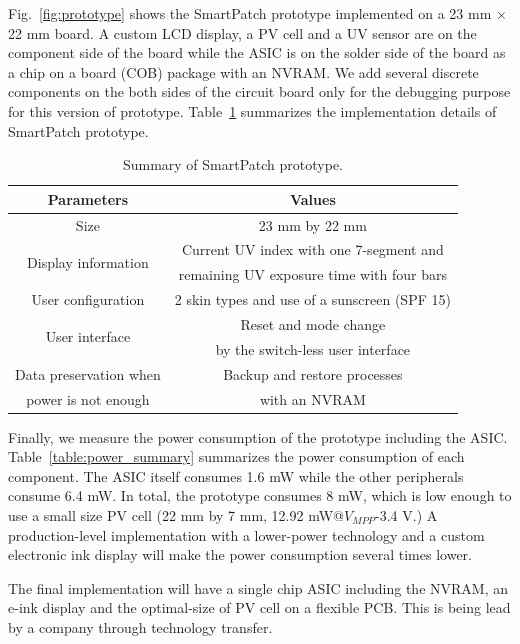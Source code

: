 \documentclass[journal]{IEEEtran}
\begin{document}
Fig.~\ref{fig:prototype} shows the SmartPatch prototype implemented on a 23 mm $\times$ 22 mm board. 
A custom LCD display, a PV cell and a UV sensor are on the component side of the board while the ASIC is on the solder side of the board as a chip on a board (COB) package with an NVRAM.  
We add several discrete components on the both sides of the circuit board only for the debugging purpose for this version of prototype. 
Table~\ref{table:prototype_summary} summarizes the implementation details of SmartPatch prototype.  

\begin{table}
\centering
\caption{Summary of SmartPatch prototype.}
\label{table:prototype_summary}
\begin{tabular}{|c|c|}  \hline
Parameters			&Values	\\ \hline \hline
Size					&23 mm by 22 mm  \\ \hline
\multirow{2}{*}{Display information}	&Current UV index with one 7-segment and\\
					&remaining UV exposure time with four bars \\ \hline
User configuration		&2 skin types and use of a sunscreen (SPF 15) \\ \hline
\multirow{2}{*}{User interface}	&Reset and mode change  \\
					&by the switch-less user interface \\ \hline
Data preservation when 	&Backup and restore processes  \\
power is not enough	&with an NVRAM \\ \hline
\end{tabular}
\end{table}

Finally, we measure the power consumption of the prototype including the ASIC. 
Table~\ref{table:power_summary} summarizes the power consumption of each component. 
The ASIC itself consumes 1.6 mW while the other peripherals consume 6.4 mW. 
In total, the prototype consumes 8 mW, which is low enough to use a small size PV cell (22 mm by 7 mm, 12.92 mW@$V_{MPP}$-3.4 V.) 
A production-level implementation with a lower-power technology and a custom electronic ink display will make the power consumption several times lower.

The final implementation will have a single chip ASIC including the NVRAM, an e-ink display and the optimal-size of PV cell on a flexible PCB. This is being lead by a company through technology transfer.
\end{document}
